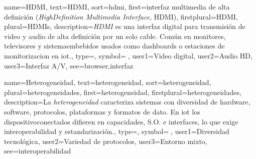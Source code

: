 	
	{
		name={HDMI},
		text={HDMI},
		sort={hdmi},
		first={interfaz multimedia de alta definici{\'o}n (\textit{High\textendash Definition Multimedia Interface}, HDMI)},
		firstplural={HDMI},
		plural={HDMIs},
		description={\emph{HDMI} es una interfaz digital para transmisi{\'o}n de video y audio de alta definici{\'o}n por un solo cable. Com{\'u}n en monitores, televisores y \glspl{sistemaembebido} usados como \glspl{dashboard} o estaciones de \gls{monitorizacion} en \gls{iot}.},
		type=\glsdefaulttype,
		symbol={🔌},
		user1={Video digital},
		user2={Audio HD},
		user3={Interfaz A/V},
		see={browser,interfaz}
	}
	
	
	{
		name={Heterogeneidad},
		text={heterogeneidad},
		sort={heterogeneidad},
		plural={heterogeneidades},
		first={heterogeneidad},
		firstplural={heterogeneidades},
		description={La \emph{heterogeneidad} caracteriza sistemas con diversidad de \gls{hardware}, software, protocolos, plataformas y formatos de \gls{dato}. En \gls{iot} los \glspl{dispositivoconectado} difieren en capacidades, S.O. e interfaces, lo que exige \gls{interoperabilidad} y estandarizaci{\'o}n.},
		type=\glsdefaulttype,
		symbol={🧩},
		user1={Diversidad tecnol{\'o}gica},
		user2={Variedad de protocolos},
		user3={Entorno mixto},
		see={interoperabilidad}
	}
	
